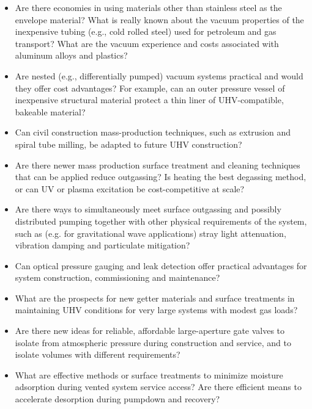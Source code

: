 \begin{itemize}
\item  Are there economies in using materials other than stainless steel as the envelope material? What is really known about the vacuum properties of the inexpensive tubing (e.g., cold rolled steel) used for petroleum and gas transport? What are the vacuum experience and costs associated with aluminum alloys and plastics?

\item Are nested (e.g., differentially pumped) vacuum systems practical and would they offer cost advantages? For example, can an outer pressure vessel of inexpensive structural material protect a thin liner of UHV-compatible, bakeable material?

\item Can civil construction mass-production techniques, such as extrusion and spiral tube milling, be adapted to future UHV construction?

\item Are there newer mass production surface treatment and cleaning techniques that can be applied reduce outgassing? Is heating the best degassing method, or can UV or plasma excitation be cost-competitive at scale?

\item Are there ways to simultaneously meet surface outgassing and possibly distributed pumping together with other physical requirements of the system, such as (e.g. for gravitational wave applications) stray light attenuation, vibration damping and particulate mitigation?

\item Can optical pressure gauging and leak detection offer practical advantages for system construction, commissioning and maintenance?

\item What are the prospects for new getter materials and surface treatments in maintaining UHV conditions for very large systems with modest gas loads?

\item Are there new ideas for reliable, affordable large-aperture gate valves to isolate from atmospheric pressure during construction and service, and to isolate volumes with different requirements?

\item What are effective methods or surface treatments to minimize moisture adsorption during vented system service access? Are there efficient means to accelerate desorption during pumpdown and recovery?

\end{itemize}



